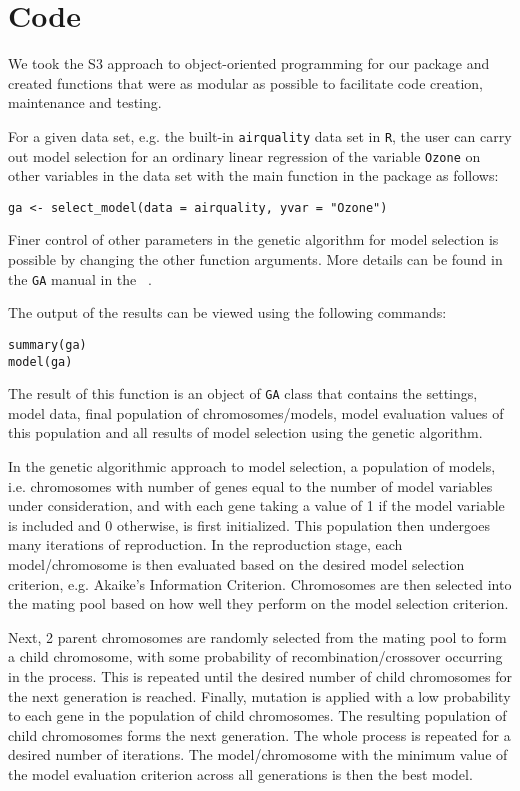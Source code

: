 \documentclass[11pt]{article}
\begin{document}
\section{Code}
\label{sec:code}
We took the S3 approach to object-oriented programming for our package and created functions that were as modular as possible to facilitate code creation, maintenance and testing.

For a given data set, e.g. the built-in \texttt{airquality} data set in \texttt{R}, the user can carry out model selection for an ordinary linear regression of the variable \texttt{Ozone} on other variables in the data set with the main function in the package as follows:
\begin{verbatim}
ga <- select_model(data = airquality, yvar = "Ozone")
\end{verbatim}

Finer control of other parameters in the genetic algorithm for model selection is possible by changing the other function arguments. More details can be found in the \texttt{GA} manual in the ~.

The output of the results can be viewed using the following commands:
\begin{verbatim}
summary(ga)
model(ga)
\end{verbatim}

The result of this function is an object of \texttt{GA} class that contains the settings, model data, final population of chromosomes/models, model evaluation values of this population and all results of model selection using the genetic algorithm.

In the genetic algorithmic approach to model selection, a population of models, i.e. chromosomes with number of genes equal to the number of model variables under consideration, and with each gene taking a value of 1 if the model variable is included and 0 otherwise, is first initialized. This population then undergoes many iterations of reproduction. In the reproduction stage, each model/chromosome is then evaluated based on the desired model selection criterion, e.g. Akaike's Information Criterion. Chromosomes are then selected into the mating pool based on how well they perform on the model selection criterion. 

Next, 2 parent chromosomes are randomly selected from the mating pool to form a child chromosome, with some probability of recombination/crossover occurring in the process. This is repeated until the desired number of child chromosomes for the next generation is reached. Finally, mutation is applied with a low probability to each gene in the population of child chromosomes. The resulting population of child chromosomes forms the next generation. The whole process is repeated for a desired number of iterations. The model/chromosome with the minimum value of the model evaluation criterion across all generations is then the best model.
\end{document}
